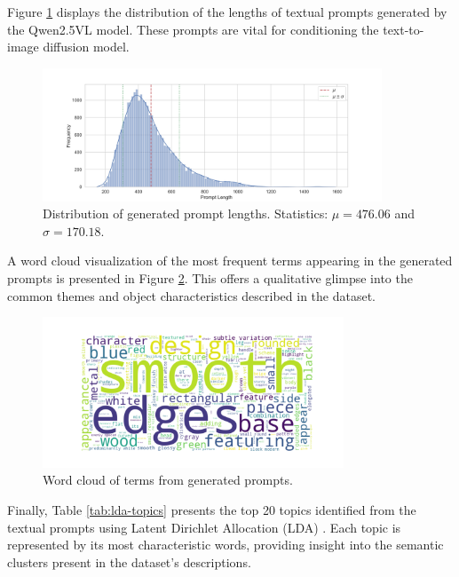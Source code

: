 Figure \ref{fig:dist-prompt-length} displays the distribution of the lengths of textual prompts generated by the Qwen2.5VL model. These prompts are vital for conditioning the text-to-image diffusion model.

\begin{figure}[h]
  \centering
  \includegraphics[width=0.9\textwidth]{images/data/objaverse_visualizations/distribution_prompt_length.jpeg}
  \caption{Distribution of generated prompt lengths. Statistics: $\mu = 476.06$ and $\sigma = 170.18$.}
  \label{fig:dist-prompt-length}
\end{figure}

A word cloud visualization of the most frequent terms appearing in the generated prompts is presented in Figure \ref{fig:wordcloud-prompts}. This offers a qualitative glimpse into the common themes and object characteristics described in the dataset.

\begin{figure}[h]
  \centering
  \includegraphics[width=0.8\textwidth]{images/data/objaverse_visualizations/wordcloud_prompts.jpeg}
  \caption{Word cloud of terms from generated prompts.}
  \label{fig:wordcloud-prompts}
\end{figure}

Finally, Table \ref{tab:lda-topics} presents the top 20 topics identified from the textual prompts using Latent Dirichlet Allocation (LDA) \cite{lda}. Each topic is represented by its most characteristic words, providing insight into the semantic clusters present in the dataset's descriptions.

